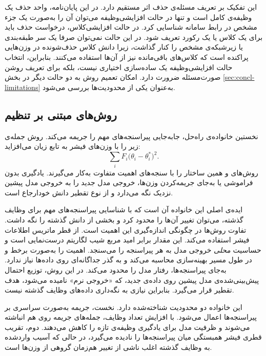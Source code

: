 این تفکیک بر تعریف مسئله‌ی حذف اثر مستقیم دارد. در این پایان‌نامه، واحد حذف یک وظیفه‌ی کامل است و تنها در حالت افزایشی‌وظیفه می‌توان آن را به‌صورت یک جزء مشخص در رابط سامانه شناسایی کرد. در حالت افزایشی‌کلاس، درخواست حذف باید برای یک کلاس یا یک رکورد تعریف شود. در این حالت نمی‌توان صرفا یک سر طبقه‌بندی یا زیرشبکه‌ی مشخص را کنار گذاشت، زیرا دانش کلاس حذف‌شونده در وزن‌هایی پراکنده است که کلاس‌های باقی‌مانده نیز از آن‌ها استفاده می‌کنند. بنابراین، انتخاب حالت افزایشی‌وظیفه یک ساده‌سازی اختیاری نیست، بلکه برای تعریف روشن صورت‌مسئله ضرورت دارد. امکان تعمیم روش به دو حالت دیگر در بخش \ref{sec:concl-limitations} به‌عنوان یکی از محدودیت‌ها بررسی می‌شود.

\subsection{روش‌های مبتنی بر تنظیم}
\label{subsec:lit-reg}

نخستین خانواده‌ی راه‌حل، جابه‌جایی پیراسنجه‌های مهم را جریمه می‌کند. روش  \cite{kirkpatrick2017overcoming} جمله‌ی زیر را با وزن‌های فیشر به تابع زیان می‌افزاید:
\begin{equation*}
	\sum_i F_i\bigl(\theta_i-\theta_i^{*}\bigr)^2.
\end{equation*}
روش‌های  \cite{zenke2017continual} و  \cite{aljundi2018memory} همین ساختار را با سنجه‌های اهمیت متفاوت به‌کار می‌گیرند. {یادگیری بدون فراموشی} یا  \cite{li2017learning} به‌جای جریمه‌کردن وزن‌ها، خروجی مدل جدید را به خروجی مدل پیشین نزدیک نگه می‌دارد و از نوع {تقطیر دانش} \cite{hinton2015distilling} خودارجاع است.

ایده‌ی اصلی این خانواده آن است که با شناسایی پیراسنجه‌های مهم برای وظایف گذشته، می‌توان تغییر آن‌ها را محدود کرد و بخشی از دانش گذشته را نگه داشت. تفاوت روش‌ها در چگونگی اندازه‌گیری این اهمیت است.  از قطر ماتریس اطلاعات فیشر استفاده می‌کند. این مقدار برابر امید مربع شیب لگاریتم درست‌نمایی است و حساسیت \emph{محلی} خروجی مدل به هر پیراسنجه را می‌سنجد.  اهمیت را به‌صورت برخط و در طول مسیر بهینه‌سازی محاسبه می‌کند و به گذر جداگانه‌ای روی داده‌ها نیاز ندارد.  به‌جای پیراسنجه‌ها، رفتار مدل را محدود می‌کند. در این روش، توزیع احتمال پیش‌بینی‌شده‌ی مدل پیشین روی داده‌ی جدید، که «خروجی نرم» نامیده می‌شود، هدف تقطیر قرار می‌گیرد. بنابراین نیازی به نگه‌داری داده‌های وظایف گذشته نیست.

این خانواده دو محدودیت شناخته‌شده دارد. نخست، جریمه به‌صورت سراسری بر پیراسنجه‌ها اعمال می‌شود. با افزایش تعداد وظایف، جمله‌های جریمه روی هم انباشته می‌شوند و ظرفیت مدل برای یادگیری وظیفه‌ی تازه را کاهش می‌دهند. دوم، تقریب قطری فیشر همبستگی میان پیراسنجه‌ها را نادیده می‌گیرد، در حالی که آسیب واردشده به وظایف گذشته اغلب ناشی از تغییر هم‌زمان گروهی از وزن‌ها است.

